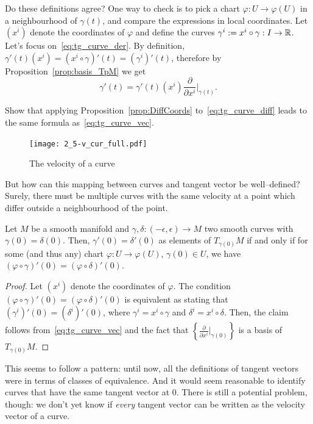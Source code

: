 Do these definitions agree?
One way to check is to pick a chart $\varphi: U \to \varphi(U)$ in a neighbourhood of $\gamma(t)$, and compare the expressions in local coordinates. Let $(x^i)$ denote the coordinates of $\varphi$ and define the curves $\gamma^i := x^i \circ \gamma : I\to\mathbb{R}$.
Let's focus on~\eqref{eq:tg_curve_der}. By definition, $\gamma'(t)(x^i) = (x^i\circ\gamma)'(t) = (\gamma^i)'(t)$, therefore by Proposition~\ref{prop:basis_TpM} we get
\begin{equation}\label{eq:tg_curve_vec}
	\gamma'(t) = %
	\gamma'(t)(x^i) \frac{\partial}{\partial x^i}\Big|_{\gamma(t)}.
\end{equation}
\begin{exercise}
	Show that applying Proposition~\ref{prop:DiffCoords} to~\eqref{eq:tg_curve_diff} leads to the same formula as~\eqref{eq:tg_curve_vec}.
\end{exercise}

\begin{figure}[htp]
	\centering
	\texttt{[image: 2\_5-v\_cur\_full.pdf]}
	\caption{The velocity of a curve}
	\label{fig:2_5-v_cur_full}
\end{figure}

But how can this mapping between curves and tangent vector be well--defined?
Surely, there must be multiple curves with the same velocity at a point which differ outside a neighbourhood of the point.

\begin{lemma}\label{lem:equiv_tg_curves}
	Let $M$ be a smooth manifold and $\gamma, \delta : (-\epsilon, \epsilon) \to M$ two smooth curves with $\gamma(0) = \delta(0)$. Then, $\gamma'(0) = \delta'(0)$ as elements of $T_{\gamma(0)}M$ if and only if for some (and thus any) chart $\varphi:U\to\varphi(U)$, $\gamma(0)\in U$, we have $(\varphi\circ \gamma)'(0) = (\varphi\circ\delta)'(0)$.
\end{lemma}
\begin{proof}
	Let $(x^i)$ denote the coordinates of $\varphi$. The condition $(\varphi\circ \gamma)'(0) = (\varphi\circ\delta)'(0)$ is equivalent as stating that $(\gamma^i)'(0) = (\delta^i)'(0)$, where $\gamma^i = x^i\circ\gamma$ and $\delta^i=x^i\circ\delta$. Then, the claim follows from~\eqref{eq:tg_curve_vec} and the fact that $\left\{\frac{\partial}{\partial x^i}\big|_{\gamma(0)}\right\}$ is a basis of $T_{\gamma(0)}M$.
\end{proof}

This seems to follow a pattern: until now, all the definitions of tangent vectors were in terms of classes of equivalence.
And it would seem reasonable to identify curves that have the same tangent vector at $0$.
There is still a potential problem, though: we don't yet know if \emph{every} tangent vector can be written as the velocity vector of a curve.

